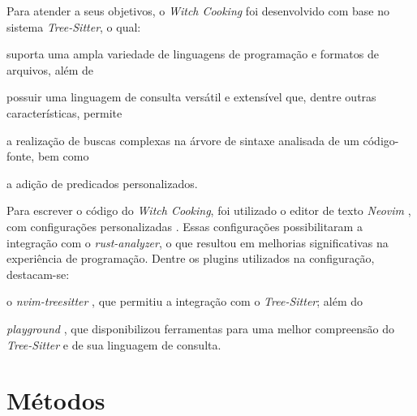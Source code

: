 \documentclass
  [11pt,a4paper,english,brazil,openright,sumario=tradicional,twoside]
  {abntex2}
\newcommand{\treesitter}{\textit{Tree-Sitter}\xspace}
\newcommand{\witchcooking}{\textit{Witch Cooking}\xspace}
\begin{document}
  Para atender a seus objetivos, o \witchcooking foi desenvolvido com base no
  sistema \treesitter \cite{tree-sitter-2023-tree}, o qual:
  \begin{inparaenum}
    \item suporta uma ampla variedade de linguagens de programação e formatos
          de arquivos, além de
    \item possuir uma linguagem de consulta versátil e extensível que, dentre
          outras características, permite
          \begin{inparaenum}
            \item a realização de buscas complexas na árvore de sintaxe
                  analisada de um código-fonte, bem como
            \item a adição de predicados personalizados.
          \end{inparaenum}
  \end{inparaenum}

  Para escrever o código do \witchcooking, foi utilizado o editor de texto
  \textit{Neovim} \cite{neovim-2023-hyperextensible}, com configurações
  personalizadas \cite{silva-2023-uma}. Essas configurações possibilitaram a
  integração com o \textit{rust-analyzer}, o que resultou em melhorias
  significativas na experiência de programação. Dentre os plugins utilizados na
  configuração, destacam-se:
  \begin{inparaenum}
    \item o \textit{nvim-treesitter} \cite{nvim-treesitter-2023-nvim}, que
          permitiu a integração com o \treesitter; além do
    \item \textit{playground} \cite{nvim-treesitter-2023-playground}, que
          disponibilizou ferramentas para uma melhor compreensão do \treesitter
          e de sua linguagem de consulta.
  \end{inparaenum}


  \section{Métodos}
\end{document}
